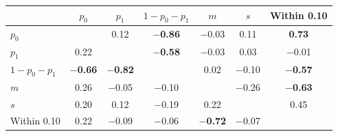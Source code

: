 \begin{tabular}{lcccccc}
\toprule
 & $p_0$ & $p_1$ & $1-p_0-p_1$ & $m$ & $s$ & Within 0.10 \\
\midrule
$p_0$ &  & 0.12 & \textbf{$-$0.86} & $-$0.03 & 0.11 & \textbf{0.73} \\
$p_1$ & 0.22 &  & \textbf{$-$0.58} & $-$0.03 & 0.03 & $-$0.01 \\
$1-p_0-p_1$ & \textbf{$-$0.66} & \textbf{$-$0.82} &  & 0.02 & $-$0.10 & \textbf{$-$0.57} \\
$m$ & 0.26 & $-$0.05 & $-$0.10 &  & $-$0.26 & \textbf{$-$0.63} \\
$s$ & 0.20 & 0.12 & $-$0.19 & 0.22 &  & 0.45 \\
Within 0.10 & 0.22 & $-$0.09 & $-$0.06 & \textbf{$-$0.72} & $-$0.07 &  \\
\bottomrule
\end{tabular}
